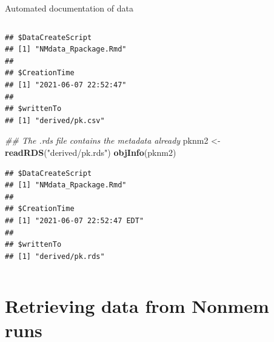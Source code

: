 \documentclass[
  8pt,
  ignorenonframetext,
  aspectratio=169]{beamer}
\newenvironment{Shaded}{\begin{snugshade}}{\end{snugshade}}
\newcommand{\CommentTok}[1]{\textcolor[rgb]{0.56,0.35,0.01}{\textit{#1}}}
\newcommand{\KeywordTok}[1]{\textcolor[rgb]{0.13,0.29,0.53}{\textbf{#1}}}
\newcommand{\NormalTok}[1]{#1}
\newcommand{\StringTok}[1]{\textcolor[rgb]{0.31,0.60,0.02}{#1}}
\begin{document}
\begin{frame}[fragile]{Automated documentation of data}
\begin{columns}[T]
\begin{column}{0.48\textwidth}
\begin{verbatim}
## $DataCreateScript
## [1] "NMdata_Rpackage.Rmd"
## 
## $CreationTime
## [1] "2021-06-07 22:52:47"
## 
## $writtenTo
## [1] "derived/pk.csv"
\end{verbatim}

\begin{Shaded}
\begin{Highlighting}[]
\CommentTok{\#\# The .rds file contains the metadata already}
\NormalTok{pknm2 \textless{}{-}}\StringTok{ }\KeywordTok{readRDS}\NormalTok{(}\StringTok{"derived/pk.rds"}\NormalTok{)}
\KeywordTok{objInfo}\NormalTok{(pknm2)}
\end{Highlighting}
\end{Shaded}

\begin{verbatim}
## $DataCreateScript
## [1] "NMdata_Rpackage.Rmd"
## 
## $CreationTime
## [1] "2021-06-07 22:52:47 EDT"
## 
## $writtenTo
## [1] "derived/pk.rds"
\end{verbatim}
\end{column}
\end{columns}

\normalsize
\end{frame}

\hypertarget{retrieving-data-from-nonmem-runs}{%
\section{Retrieving data from Nonmem
runs}\label{retrieving-data-from-nonmem-runs}}
\end{document}
